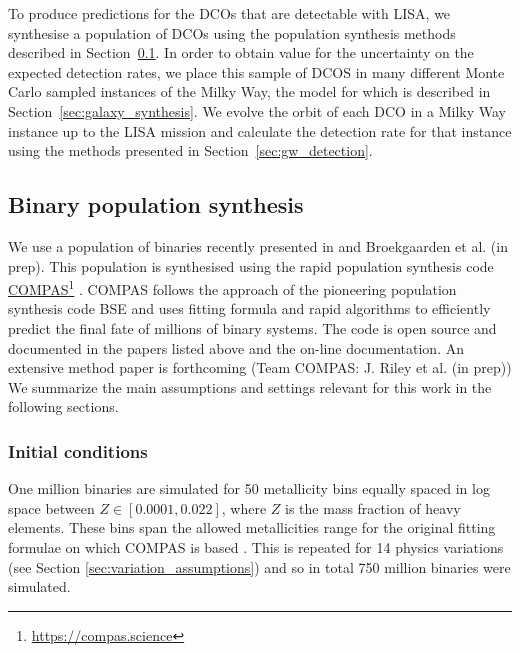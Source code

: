 To produce predictions for the DCOs that are detectable with LISA, we synthesise a population of DCOs using the population synthesis methods described in Section~\ref{sec:COMPAS_explained}. In order to obtain value for the uncertainty on the expected detection rates, we place this sample of DCOS in many different Monte Carlo sampled instances of the Milky Way, the model for which is described in Section~\ref{sec:galaxy_synthesis}. We evolve the orbit of each DCO in a Milky Way instance up to the LISA mission and calculate the detection rate for that instance using the methods presented in Section~\ref{sec:gw_detection}.

\subsection{Binary population synthesis}\label{sec:COMPAS_explained}

We use a population of binaries recently presented in \citet{Broekgaarden+2021} and Broekgaarden et al. (in prep). This population is synthesised using the rapid population synthesis code \href{https://compas.science}{COMPAS}\footnote{\url{https://compas.science}} \citep{Stevenson+2017, Vigna-Gomez+2018, Stevenson+2019}. COMPAS follows the approach of the pioneering population synthesis code BSE \citep{Hurley+2000,Hurley+2002} and uses fitting formula and rapid algorithms to efficiently predict the final fate of millions of binary systems. The code is open source and documented in the papers listed above and the on-line documentation. An extensive method paper is forthcoming (Team COMPAS: J. Riley et al. (in prep)) We summarize the main assumptions and settings relevant for this work in the following sections.

\subsubsection{Initial conditions}

One million binaries are simulated for 50 metallicity bins equally spaced in log space between $Z \in [0.0001, 0.022]$, where $Z$ is the mass fraction of heavy elements. These bins span the allowed metallicities range for the original fitting formulae on which COMPAS is based \citep{Hurley+2000}. This is repeated for 14 physics variations (see Section \ref{sec:variation_assumptions}) and so in total 750 million binaries were simulated.

